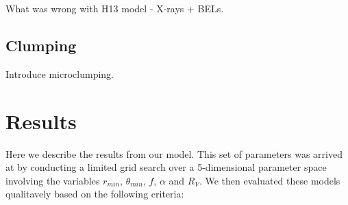 \documentclass[preprint, a4paper, 11pt]{aastex}
\begin{document}
What was wrong with H13 model - X-rays + BELs.

\subsection{Clumping}

Introduce microclumping.










\section{Results}

Here we describe the results from our model. This set of parameters
was arrived at by conducting a limited grid search over a 
5-dimensional parameter space involving the variables
$r_{min}$, $\theta_{min}$, $f$, $\alpha$ and $R_V$.
We then evaluated these models qualitavely based on the following
criteria:
\end{document}
